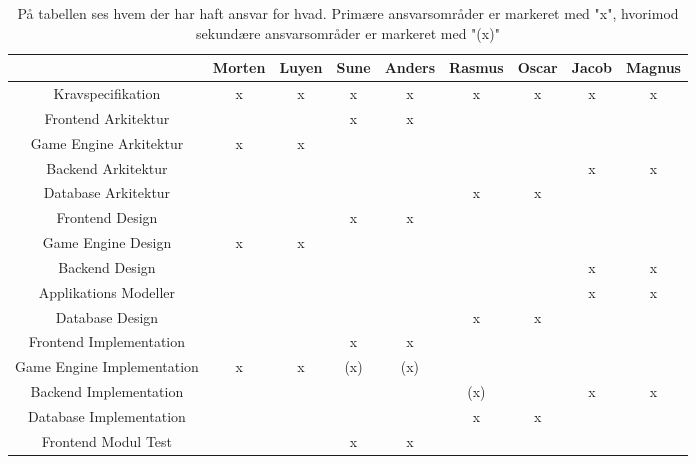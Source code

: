 \begin{center}
  \begin{longtable}{|c|c|c|c|c|c|c|c|c|}
  \caption{På tabellen ses hvem der har haft ansvar for hvad. Primære ansvarsområder er markeret med "x", hvorimod sekundære ansvarsområder er markeret med "(x)"}
    \hline
                                & Morten & Luyen & Sune  & Anders & Rasmus & Oscar & Jacob & Magnus \\ \hline
    Kravspecifikation           & x      & x     & x     & x      & x      & x     & x     & x      \\ \hline
    Frontend Arkitektur         &        &       & x     & x      &        &       &       &        \\ \hline
    Game Engine Arkitektur      & x      & x     &       &        &        &       &       &        \\ \hline
    Backend Arkitektur          &        &       &       &        &        &       & x     & x      \\ \hline
    Database Arkitektur         &        &       &       &        & x      & x     &       &        \\ \hline
    Frontend Design             &        &       & x     & x      &        &       &       &        \\ \hline
    Game Engine Design          & x      & x     &       &        &        &       &       &        \\ \hline
    Backend Design              &        &       &       &        &        &       & x     & x      \\ \hline
    Applikations Modeller       &        &       &       &        &        &       & x     & x      \\ \hline
    Database Design             &        &       &       &        & x      & x     &       &        \\ \hline
    Frontend Implementation     &        &       & x     & x      &        &       &       &        \\ \hline
    Game Engine Implementation  & x      & x     & (x)      & (x)       &        &       &       &        \\ \hline
    Backend Implementation      &        &       &       &        & (x)       &       & x     & x      \\ \hline
    Database Implementation     &        &       &       &        & x      & x     &       &        \\ \hline
    Frontend Modul Test         &        &       & x     & x      &        &       &       &        \\ \hline

\end{longtable}
\end{center}
